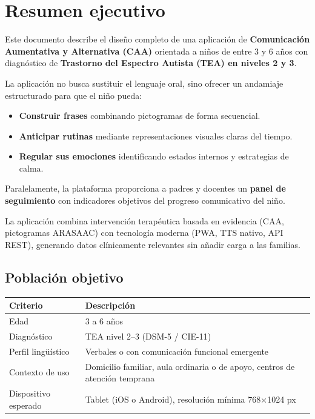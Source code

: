 \documentclass[12pt, a4paper]{article}
\begin{document}
\newpage
\tableofcontents
\newpage

\section{Resumen ejecutivo}

Este documento describe el diseño completo de una aplicación de \textbf{Comunicación Aumentativa y Alternativa (CAA)} orientada a niños de entre 3 y 6 años con diagnóstico de \textbf{Trastorno del Espectro Autista (TEA) en niveles 2 y 3}.

La aplicación no busca sustituir el lenguaje oral, sino ofrecer un andamiaje estructurado para que el niño pueda:

\begin{itemize}
  \item \textbf{Construir frases} combinando pictogramas de forma secuencial.
  \item \textbf{Anticipar rutinas} mediante representaciones visuales claras del tiempo.
  \item \textbf{Regular sus emociones} identificando estados internos y estrategias de calma.
\end{itemize}

Paralelamente, la plataforma proporciona a padres y docentes un \textbf{panel de seguimiento} con indicadores objetivos del progreso comunicativo del niño.

\begin{puntoclave}
La aplicación combina intervención terapéutica basada en evidencia (CAA, pictogramas ARASAAC) con tecnología moderna (PWA, TTS nativo, API REST), generando datos clínicamente relevantes sin añadir carga a las familias.
\end{puntoclave}

\subsection{Población objetivo}

\begin{tabular}{L{4cm} L{10cm}}
\toprule
\textbf{Criterio} & \textbf{Descripción} \\
\midrule
Edad & 3 a 6 años \\
Diagnóstico & TEA nivel 2--3 (DSM-5 / CIE-11) \\
Perfil lingüístico & Verbales o con comunicación funcional emergente \\
Contexto de uso & Domicilio familiar, aula ordinaria o de apoyo, centros de atención temprana \\
Dispositivo esperado & Tablet (iOS o Android), resolución mínima 768×1024 px \\
\bottomrule
\end{tabular}
\end{document}
